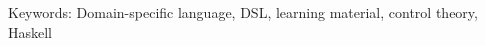 


\vfill
\noindent Keywords: Domain-specific language, DSL, learning material, control theory, Haskell